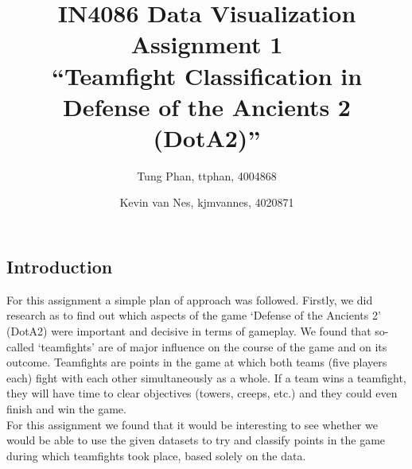 \documentclass[11pt,twoside,a4paper]{article}
\title{
  IN4086 Data Visualization\\
  Assignment 1\\
  ``Teamfight Classification in Defense of the Ancients 2 (DotA2)''
}
\author{
    Tung Phan, ttphan, 4004868 \and
    Kevin van Nes, kjmvannes, 4020871
}
\begin{document}
\maketitle
\newpage

\subsection*{Introduction}
For this assignment a simple plan of approach was followed. Firstly, we did research as to find out which aspects of the game `Defense of the Ancients 2' (DotA2) were important and decisive in terms of gameplay. We found that so-called `teamfights' are of major influence on the course of the game and on its outcome. Teamfights are points in the game at which both teams (five players each) fight with each other simultaneously as a whole. If a team wins a teamfight, they will have time to clear objectives (towers, creeps, etc.) and they could even finish and win the game.\\
For this assignment we found that it would be interesting to see whether we would be able to use the given datasets to try and classify points in the game during which teamfights took place, based solely on the data.
\end{document}
